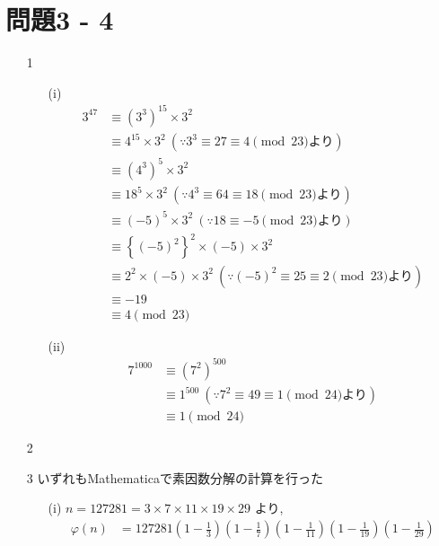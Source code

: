 \documentclass[12pt,a4paper]{jsarticle}
\begin{document}
\section*{問題3 - 4}
\begin{enumerate}
 \item[1]  \mbox{} \\
 \begin{itemize}
 \item[(i)]
 \begin{align*}
 3^{47} &\equiv (3^3)^{15} \times 3^2 \\
      &\equiv 4^{15} \times 3^2 ~(\because 3^3 \equiv 27 \equiv 4 \pmod{23} \mbox{より}) \\
      &\equiv (4^3)^5 \times 3^2 \\
      &\equiv 18^5 \times 3^2 ~(\because 4^3 \equiv 64 \equiv 18 \pmod{23} \mbox{より}) \\
      &\equiv (-5)^5 \times 3^2 ~(\because 18 \equiv -5 \pmod{23} \mbox{より}) \\
      &\equiv \left\{(-5)^2 \right\}^2 \times (-5) \times 3^2 \\
      &\equiv 2^2 \times (-5) \times 3^2 ~(\because (-5)^2 \equiv 25 \equiv 2 \pmod{23} \mbox{より}) \\
      &\equiv -19 \\
      &\equiv 4 \pmod{23}
 \end{align*}
 \item[(ii)]
 \begin{align*}
 7^{1000} &\equiv (7^2)^{500} \\
      &\equiv 1^{500} ~(\because 7^2 \equiv 49 \equiv 1 \pmod{24}\mbox{より}) \\
      &\equiv 1 \pmod{24}
 \end{align*}
 \end{itemize}
 \item[2]  \mbox{} \\
 \item[3]  \mbox{いずれもMathematicaで素因数分解の計算を行った} \\
 \begin{itemize}
 \item[(i)]
 $n = 127281 = 3 \times 7 \times 11 \times 19 \times 29 $ より,
 \begin{align*}
 \varphi(n) &= 127281 \left(1-\frac{1}{3}\right) \left(1-\frac{1}{7}\right)
   \left(1-\frac{1}{11}\right) \left(1-\frac{1}{19}\right)
   \left(1-\frac{1}{29}\right) \\

\end{align*}
\end{itemize}
\end{enumerate}
\end{document}
